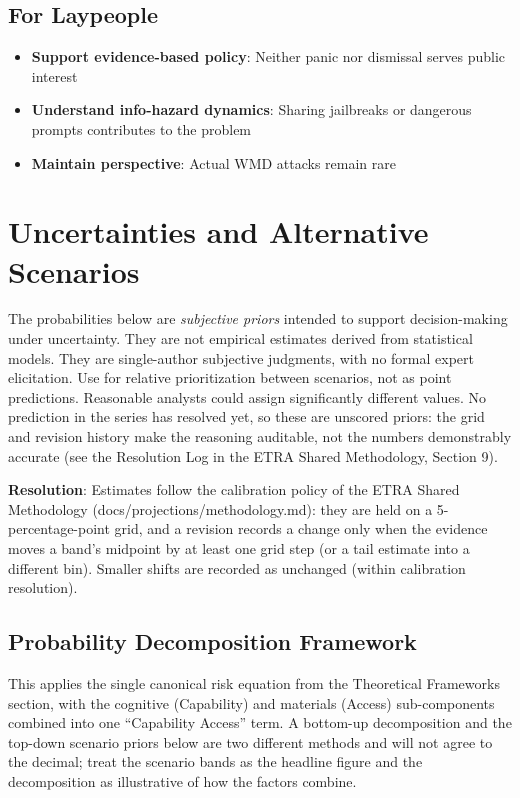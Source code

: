 \documentclass[11pt,letterpaper]{article}
\begin{document}
\subsection{For Laypeople}

\begin{itemize}
  \item \textbf{Support evidence-based policy}: Neither panic nor dismissal serves public interest
  \item \textbf{Understand info-hazard dynamics}: Sharing jailbreaks or dangerous prompts contributes to the problem
  \item \textbf{Maintain perspective}: Actual WMD attacks remain rare
\end{itemize}

\section{Uncertainties and Alternative Scenarios}

\begin{notebox}
The probabilities below are \textit{subjective priors} intended to support decision-making under uncertainty. They are not empirical estimates derived from statistical models. They are single-author subjective judgments, with no formal expert elicitation. Use for relative prioritization between scenarios, not as point predictions. Reasonable analysts could assign significantly different values. No prediction in the series has resolved yet, so these are unscored priors: the grid and revision history make the reasoning auditable, not the numbers demonstrably accurate (see the Resolution Log in the ETRA Shared Methodology, Section 9).

\textbf{Resolution}: Estimates follow the calibration policy of the ETRA Shared Methodology (docs/projections/methodology.md): they are held on a 5-percentage-point grid, and a revision records a change only when the evidence moves a band's midpoint by at least one grid step (or a tail estimate into a different bin). Smaller shifts are recorded as unchanged (within calibration resolution).
\end{notebox}

\subsection{Probability Decomposition Framework}

This applies the single canonical risk equation from the Theoretical Frameworks section, with the cognitive (Capability) and materials (Access) sub-components combined into one ``Capability Access'' term. A bottom-up decomposition and the top-down scenario priors below are two different methods and will not agree to the decimal; treat the scenario bands as the headline figure and the decomposition as illustrative of how the factors combine.
\end{document}
